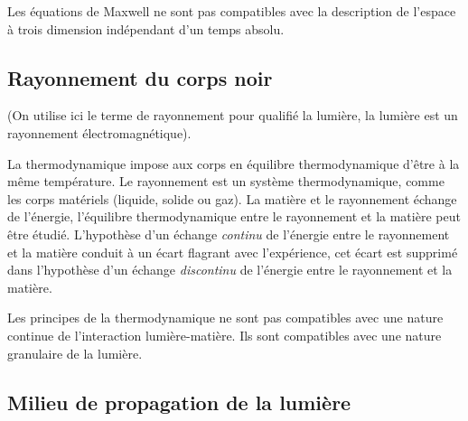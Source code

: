 
Les équations de Maxwell ne sont pas compatibles avec la description de l'espace à trois dimension indépendant d'un temps absolu.

\subsection{Rayonnement du corps noir}
(On utilise ici le terme de rayonnement pour qualifié la lumière, la lumière est un rayonnement électromagnétique).

La thermodynamique impose aux corps en équilibre thermodynamique d'être à la même température. Le rayonnement est un système thermodynamique, comme les corps matériels (liquide, solide ou gaz). La matière et le rayonnement échange de l'énergie, l'équilibre thermodynamique entre le rayonnement et la matière peut être étudié. L'hypothèse d'un échange {\it continu} de l'énergie entre le rayonnement et la matière conduit à un écart flagrant avec l'expérience, cet écart est supprimé dans l'hypothèse d'un échange {\it discontinu} de l'énergie entre le rayonnement et la matière.

Les principes de la thermodynamique ne sont pas compatibles avec une nature continue de l'interaction lumière-matière. Ils sont compatibles avec une nature granulaire de la lumière.

\begin{center}

\end{center}



\subsection{Milieu de propagation de la lumière}

\begin{center}

\end{center}

